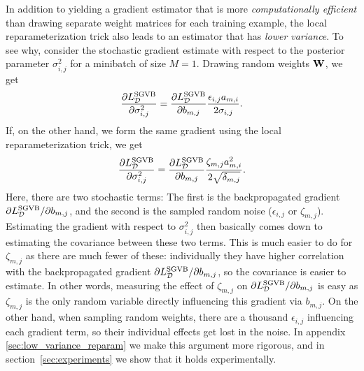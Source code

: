 In addition to yielding a gradient estimator that is more \textit{computationally efficient} than drawing separate weight matrices for each training example, the local reparameterization trick also leads to an estimator that has \textit{lower variance}. To see why, consider the stochastic gradient estimate with respect to the posterior parameter $\sigma^{2}_{i,j}$ for a minibatch of size $M=1$. Drawing random weights $\mathbf{W}$, we get
\begin{align}
\label{eq:stochest_weights}
\frac{\partial L_{\mathcal{D}}^\text{SGVB}}{\partial \sigma^{2}_{i,j}} = \frac{\partial L_{\mathcal{D}}^\text{SGVB}}{\partial b_{m,j}}\frac{\epsilon_{i,j}a_{m,i}}{2\sigma_{i,j}}.
\end{align}
If, on the other hand, we form the same gradient using the local reparameterization trick, we get
\begin{align}
\label{eq:stochest_local}
\frac{\partial L_{\mathcal{D}}^\text{SGVB}}{\partial \sigma^{2}_{i,j}} = \frac{\partial L_{\mathcal{D}}^\text{SGVB}}{\partial b_{m,j}}\frac{\zeta_{m,j}a_{m,i}^{2}}{2\sqrt{\delta_{m,j}}}.
\end{align}
Here, there are two stochastic terms: The first is the backpropagated gradient $\partial L_{\mathcal{D}}^\text{SGVB} / \partial b_{m,j}$, and the second is the sampled random noise ($\epsilon_{i,j}$ or $\zeta_{m,j}$). Estimating the gradient with respect to $\sigma^{2}_{i,j}$ then basically comes down to estimating the covariance between these two terms. This is much easier to do for $\zeta_{m,j}$ as there are much fewer of these: individually they have higher correlation with the backpropagated gradient $\partial L_{\mathcal{D}}^\text{SGVB}/\partial b_{m,j}$, so the covariance is easier to estimate. In other words, measuring the effect of $\zeta_{m,j}$ on $\partial L_{\mathcal{D}}^\text{SGVB}/\partial b_{m,j}$ is easy as $\zeta_{m,j}$ is the only random variable directly influencing this gradient via $b_{m,j}$. On the other hand, when sampling random weights, there are a thousand $\epsilon_{i,j}$ influencing each gradient term, so their individual effects get lost in the noise. In appendix \ref{sec:low_variance_reparam} we make this argument more rigorous, and in section~\ref{sec:experiments} we show that it holds experimentally.


